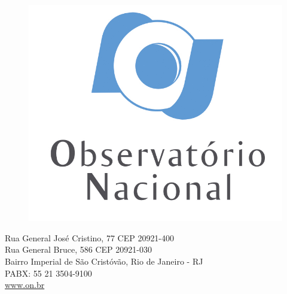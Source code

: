 \documentclass[10pt]{beamer} %
\newcommand{\nologo}{\setbeamertemplate{logo}{}} %
\begin{document}
\makeatother
{\nologo
\begin{frame}
\begin{figure}
\includegraphics[scale=0.25]{Imagens/logonvertical.jpg}
\end{figure}
\begin{center}
\begin{minipage}{0.77\textwidth}
\small
\begin{center}
Rua General José Cristino, 77 CEP 20921-400\\
Rua General Bruce, 586 CEP 20921-030\\
Bairro Imperial de São Cristóvão, Rio de Janeiro - RJ\\
PABX: 55 21 3504-9100\\
\url{www.on.br}
\end{center}
\end{minipage}
\end{center}
\end{frame}
}
\end{document}
